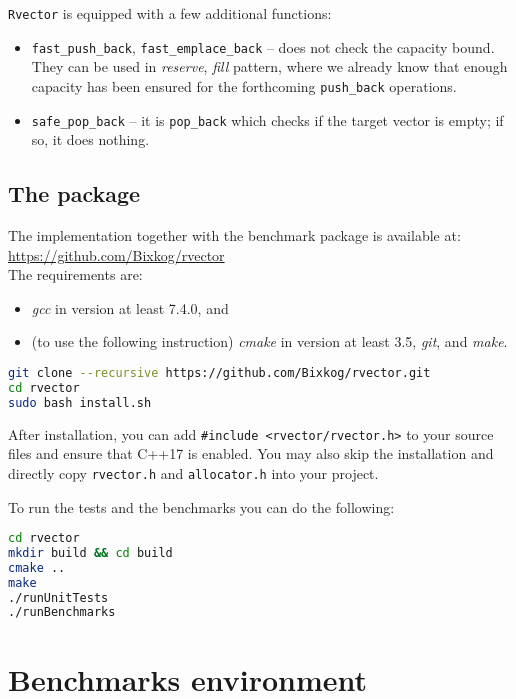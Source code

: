 \documentclass[inz, english, shortabstract]{iithesis}
\begin{document}
{\tt Rvector} is equipped with a few additional functions:
\begin{itemize}
\item {\tt fast\_push\_back}, {\tt fast\_emplace\_back} -- does not check the capacity bound. They can be used in \emph{reserve}, \emph{fill} pattern, where we already know that enough capacity has been ensured for the forthcoming {\tt push\_back} operations.
\item {\tt safe\_pop\_back} -- it is {\tt pop\_back} which checks if the target vector is empty; if so, it does nothing.
\end{itemize}


\section{The package}

The implementation together with the benchmark package is available at: \\
\url{https://github.com/Bixkog/rvector} \\
The requirements are:
\begin{itemize}
\item \emph{gcc} in version at least 7.4.0, and
\item (to use the following instruction) \emph{cmake} in version at least 3.5, \emph{git}, and \emph{make}.
\end{itemize}

\begin{lstlisting}[caption=Installation, language=bash]
git clone --recursive https://github.com/Bixkog/rvector.git
cd rvector
sudo bash install.sh
\end{lstlisting}
After installation, you can add \lstinline{#include <rvector/rvector.h>}{} to your source files and ensure that C++17 is enabled.
You may also skip the installation and directly copy \lstinline{rvector.h}{} and \lstinline{allocator.h}{} into your project.

To run the tests and the benchmarks you can do the following:
\begin{lstlisting}[caption=Benchmarks and unit tests, language=bash]
cd rvector
mkdir build && cd build
cmake ..
make
./runUnitTests
./runBenchmarks
\end{lstlisting}

\chapter{Benchmarks environment}
\end{document}
